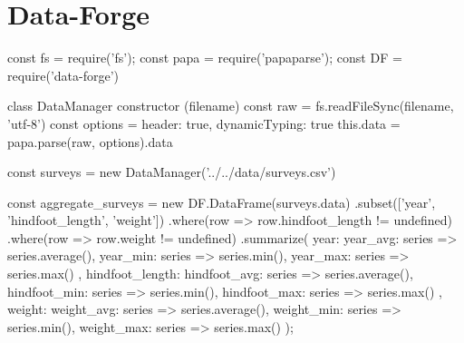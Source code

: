 \section{Data-Forge}


const fs = require('fs');
const papa = require('papaparse');
const DF = require('data-forge')

class DataManager {
    constructor (filename) {
    const raw = fs.readFileSync(filename, 'utf-8') 
    const options = {header: true, dynamicTyping: true} 
    this.data = papa.parse(raw, options).data
    } 
}

const surveys = new DataManager('../../data/surveys.csv')

const aggregate_surveys = new DF.DataFrame(surveys.data)
    .subset(['year', 'hindfoot_length', 'weight'])
    .where(row => row.hindfoot_length != undefined)
    .where(row => row.weight != undefined)
    .summarize({
        year: {
            year_avg: series => series.average(),
            year_min: series => series.min(),
            year_max: series => series.max()
        },
        hindfoot_length: {
            hindfoot_avg: series => series.average(),
            hindfoot_min: series => series.min(),
            hindfoot_max: series => series.max()
        },
        weight: {
            weight_avg: series => series.average(),
            weight_min: series => series.min(),
            weight_max: series => series.max()
        }
    });
